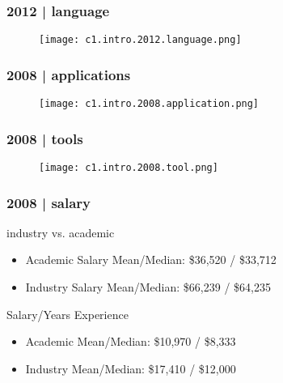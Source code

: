 \begin{frame}
  \frametitle{2012 | language}
   \begin{figure}
     \centering
     \texttt{[image: c1.intro.2012.language.png]}
   \end{figure} 
\end{frame}

\begin{frame}
  \frametitle{2008 | applications}
   \begin{figure}
     \centering
     \texttt{[image: c1.intro.2008.application.png]}
   \end{figure} 
\end{frame}

\begin{frame}
  \frametitle{2008 | tools}
   \begin{figure}
     \centering
     \texttt{[image: c1.intro.2008.tool.png]}
   \end{figure} 
\end{frame}

\begin{frame}
  \frametitle{2008 | salary}
  \begin{block}{industry vs. academic}
    \begin{itemize}
      \item Academic Salary Mean/Median: \$36,520 / \$33,712
      \item Industry Salary Mean/Median: \$66,239 / \$64,235 
    \end{itemize}
  \end{block}
  \pause
  \begin{block}{Salary/Years Experience}
    \begin{itemize}
      \item Academic Mean/Median: \$10,970 / \$8,333
      \item Industry Mean/Median: \$17,410 / \$12,000 
    \end{itemize}
  \end{block}
\end{frame}

